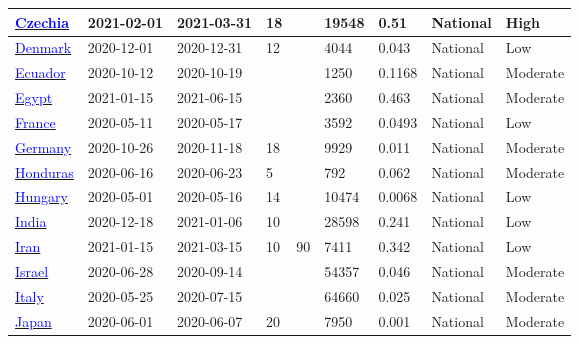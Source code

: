 \begin{table}[!ht]
\begin{center}
\begin{tabular}{p{2cm} | p{1.6cm} | p{1.6cm} | p{0.8cm} | p{0.8cm} | p{1cm} | p{1.3cm} | p{1.2cm} | p{1.2cm}}
\hline 
\href{https://doi.org/10.1038/s43856-022-00080-0}{\textcolor{blue}{Czechia}} & 2021-02-01 & 2021-03-31 & 18 &  & 19548 & 0.51 & National & High \\ 
\hline 
\href{https://dx.doi.org/10.1007/s10654-021-00796-8}{\textcolor{blue}{Denmark}} & 2020-12-01 & 2020-12-31 & 12 &  & 4044 & 0.043 & National & Low \\ 
\hline 
\href{https://dx.doi.org/10.3389/fmed.2022.933260}{\textcolor{blue}{Ecuador}} & 2020-10-12 & 2020-10-19 &  &  & 1250 & 0.1168 & National & Moderate \\ 
\hline 
\href{https://dx.doi.org/10.1186/s41182-022-00448-x}{\textcolor{blue}{Egypt}} & 2021-01-15 & 2021-06-15 &  &  & 2360 & 0.463 & National & Moderate \\ 
\hline 
\href{https://dx.doi.org/10.1038/s41467-021-23233-6}{\textcolor{blue}{France}} & 2020-05-11 & 2020-05-17 &  &  & 3592 & 0.0493 & National & Low \\ 
\hline 
\href{https://www.ifo.de/en/publikationen/2020/monograph-authorship/die-deutschen-und-corona}{\textcolor{blue}{Germany}} & 2020-10-26 & 2020-11-18 & 18 &  & 9929 & 0.011 & National & Moderate \\ 
\hline 
\href{https://revistas.ucr.ac.cr/index.php/psm/article/view/43261/46175}{\textcolor{blue}{Honduras}} & 2020-06-16 & 2020-06-23 & 5 &  & 792 & 0.062 & National & Moderate \\ 
\hline 
\href{https://dx.doi.org/10.1007/s11357-020-00226-9}{\textcolor{blue}{Hungary}} & 2020-05-01 & 2020-05-16 & 14 &  & 10474 & 0.0068 & National & Low \\ 
\hline 
\href{http://dx.doi.org/10.1016/j.ijid.2021.05.040}{\textcolor{blue}{India}} & 2020-12-18 & 2021-01-06 & 10 &  & 28598 & 0.241 & National & Low \\ 
\hline 
\href{https://dx.doi.org/10.1186/s12889-022-13464-7}{\textcolor{blue}{Iran}} & 2021-01-15 & 2021-03-15 & 10 & 90 & 7411 & 0.342 & National & Low \\ 
\hline 
\href{https://dx.doi.org/10.1007/s10654-021-00749-1}{\textcolor{blue}{Israel}} & 2020-06-28 & 2020-09-14 &  &  & 54357 & 0.046 & National & Moderate \\ 
\hline 
\href{https://www.istat.it/it/files//2020/08/ReportPrimiRisultatiIndagineSiero.pdf}{\textcolor{blue}{Italy}} & 2020-05-25 & 2020-07-15 &  &  & 64660 & 0.025 & National & Moderate \\ 
\hline 
\href{https://dx.doi.org/10.3201/eid2702.204088}{\textcolor{blue}{Japan}} & 2020-06-01 & 2020-06-07 & 20 &  & 7950 & 0.001 & National & Moderate \\ 

\end{tabular}
\end{center}
\end{table}
